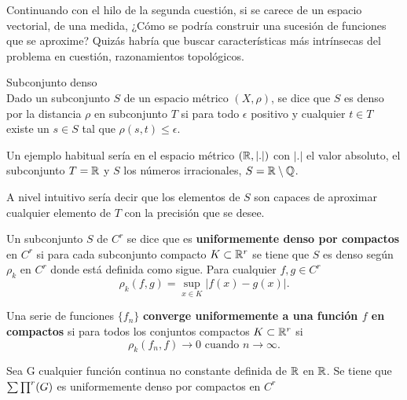 Continuando con el hilo de la segunda cuestión, si se carece de un espacio vectorial, 
de una medida,  ¿Cómo se podría construir una sucesión de funciones que se aproxime?
Quizás habría que buscar características más intrínsecas del problema en cuestión, 
razonamientos topológicos.

\begin{definicion} Subconjunto denso \\  
    Dado un subconjunto $S$ de un espacio métrico $(X, \rho)$, se dice que $S$ es denso por la distancia $\rho$
    en subconjunto $T$ si para todo $\epsilon$ positivo y cualquier $t \in T$ existe un $s \in S$ tal 
    que $\rho(s,t) \leq \epsilon$. 
\end{definicion}

Un ejemplo habitual sería en el espacio métrico $(\mathbb{R}, |.|)$ con $|.|$ el valor absoluto, el subconjunto 
$T = \mathbb{R}$ y $S$ los números irracionales, $S = \mathbb{R} \setminus \mathbb{Q}$. 

A nivel intuitivo sería decir que los elementos de $S$ son capaces de aproximar cualquier elemento de $T$
con la precisión que se desee. 

\begin{definicion} 
    Un subconjunto $S$ de $C^r$ se dice que es \textbf{uniformemente denso por compactos} en  $C^r$
    si para cada subconjunto compacto $K \subset \mathbb{R}^r$ se tiene que $S$ es denso según $\rho_k$ en $C^r$
    donde está definida como sigue.
    Para cualquier $f,g \in C^r$ 
    \begin{equation}
        \rho _ k (f,g) = \sup_{x \in K} |f(x) - g(x)|.
    \end{equation}
\end{definicion}

\begin{definicion}
    Una serie de funciones $\{f_n\}$ \textbf{converge uniformemente a una función $f$ en compactos} si para 
    todos los conjuntos compactos $K \subset \mathbb{R}^r$ si 
    \begin{equation}
        \rho_k (f_n, f) \longrightarrow 0 \text{ cuando } n \longrightarrow \infty.
    \end{equation} 
\end{definicion}

\begin{teorema}   \label{teo:TeoremaConvergenciaRealEnCompactosDefinicionesEsenciales}

    Sea G cualquier función continua no constante definida de $\mathbb{R}$ en $\mathbb{R}$. 
    Se tiene que $\sum \prod^r (G)$ es uniformemente denso por compactos en $C^r$
\end{teorema}

